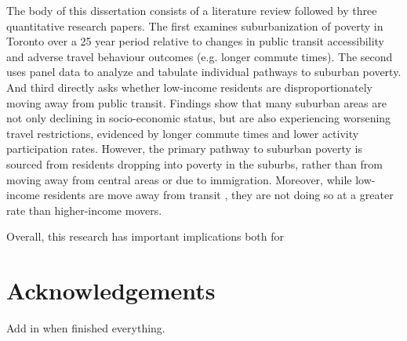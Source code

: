 \documentclass[11 pt, letterpaper]{report}
\begin{document}
The body of this dissertation consists of a literature review followed by three quantitative research papers. The first examines suburbanization of poverty in Toronto over a 25 year period relative to changes in public transit accessibility and adverse travel behaviour outcomes (e.g. longer commute times). The second uses panel data to analyze and tabulate individual pathways to suburban poverty. And third directly asks whether low-income residents are disproportionately moving away from public transit. Findings show that many suburban areas are not only declining in socio-economic status, but are also experiencing worsening travel restrictions, evidenced by longer commute times and lower activity participation rates. However, the  primary pathway to suburban poverty is sourced from residents dropping into poverty in the suburbs, rather than from moving away from central areas or due to immigration. Moreover, while low-income residents are move away from transit , they are not doing so at a greater rate than higher-income movers. 

Overall, this research has important implications both for 





\vspace{12mm}



\newpage


\chapter*{\Large{Acknowledgements}}


Add in when finished everything.



%
%
%
%

%
%
%
%
%
%
%
\end{document}
